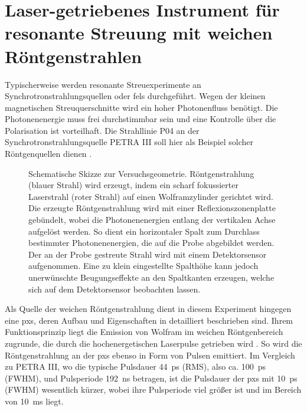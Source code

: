 \chapter{Laser-getriebenes Instrument für resonante Streuung mit weichen Röntgenstrahlen}
\label{text:quelle_roentgen}
Typischerweise werden resonante Streuexperimente an Synchrotronstrahlungsquellen oder \gls{fel}s durchgeführt. Wegen der kleinen magnetischen Streuquerschnitte wird ein hoher Photonenfluss benötigt. Die Photonenenergie muss frei durchstimmbar sein und eine Kontrolle über die Polarisation ist vorteilhaft. Die Strahllinie P04 an der Synchrotronstrahlungsquelle PETRA III soll hier als Beispiel solcher Röntgenquellen dienen \cite{viefhaus_variable_2013}.
\begin{figure}[H]
    \centering
    
    \caption{Schematische Skizze zur Versuchsgeometrie. Röntgenstrahlung (blauer Strahl) wird erzeugt, indem ein scharf fokussierter Laserstrahl (roter Strahl) auf einen Wolframzylinder gerichtet wird. Die erzeugte Röntgenstrahlung wird mit einer Reflexionszonenplatte gebündelt, wobei die Photonenenergien entlang der vertikalen Achse aufgelöst werden. So dient ein horizontaler Spalt zum Durchlass bestimmter Photonenenergien, die auf die Probe abgebildet werden. Der an der Probe gestreute Strahl wird mit einem Detektorsensor aufgenommen. Eine zu klein eingestellte Spalthöhe kann jedoch unerwünschte Beugungseffekte an den Spaltkanten erzeugen, welche sich auf dem Detektorsensor beobachten lassen.}
    \label{fig:pxs_aufbau}
\end{figure}
\noindent
Als Quelle der weichen Röntgenstrahlung dient in diesem Experiment hingegen eine \gls{pxs}, deren Aufbau und Eigenschaften in \cite{schick_laser-driven_2021} detailliert beschrieben sind. Ihrem Funktionsprinzip liegt die Emission von Wolfram im weichen Röntgenbereich zugrunde, die durch die hochenergetischen Laserpulse getrieben wird \cite{mantouvalou_high_2015}. So wird die Röntgenstrahlung an der \gls{pxs} ebenso in Form von Pulsen emittiert. Im Vergleich zu PETRA III, wo die typische Pulsdauer \SI{44}{\pico\second} (RMS), also ca. \SI{100}{\pico\second} (FWHM), und Pulsperiode \SI{192}{\nano\second}  betragen, ist die Pulsdauer der \gls{pxs} mit \SI{10}{\pico\second} (FWHM) wesentlich kürzer, wobei ihre Pulsperiode viel größer ist und im Bereich von \SI{10}{\milli\second} liegt.
